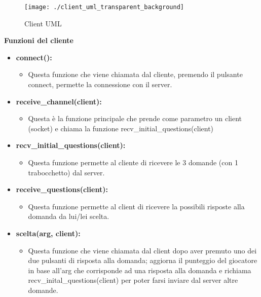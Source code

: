 
\begin{figure}[p] %
	\centering
	\texttt{[image: ./client\_uml\_transparent\_background]}
	\caption{Client UML}
	\label{fig:client_uml}
\end{figure}


\textbf{\large Funzioni del cliente}
\begin{itemize}
	\item \textbf{\normalsize connect():}
	\begin{itemize}
		\item \textsf{\normalsize Questa funzione che viene chiamata dal cliente, premendo il pulsante connect, permette la connessione con il server.}
	\end{itemize}
	\item \textbf{\normalsize receive\_channel(client): }
	\begin{itemize}
		\item \textsf{\normalsize Questa è la funzione principale che prende come parametro un client (socket) e chiama la funzione recv\_initial\_questions(client)}
	\end{itemize}
	\item \textbf{\normalsize recv\_initial\_questions(client): }
	\begin{itemize}
		\item \textsf{\normalsize Questa funzione permette al cliente di ricevere le 3 domande (con 1 trabocchetto) dal server.}
	\end{itemize}
	\item \textbf{\normalsize receive\_questions(client): }
	\begin{itemize}
		\item \textsf{\normalsize Questa funzione permette al client di ricevere la possibili risposte alla domanda da lui/lei scelta.}
	\end{itemize}
	\item \textbf{\normalsize scelta(arg, client):}
	\begin{itemize}
		\item \textsf{\normalsize Questa funzione che viene chiamata dal client dopo aver premuto uno dei due pulsanti di risposta alla domanda; aggiorna il punteggio del giocatore in base all'arg che corrisponde ad una risposta alla domanda  e richiama recv\_inital\_questions(client) per poter farsi inviare dal server altre domande.}

\end{itemize}
\end{itemize}
